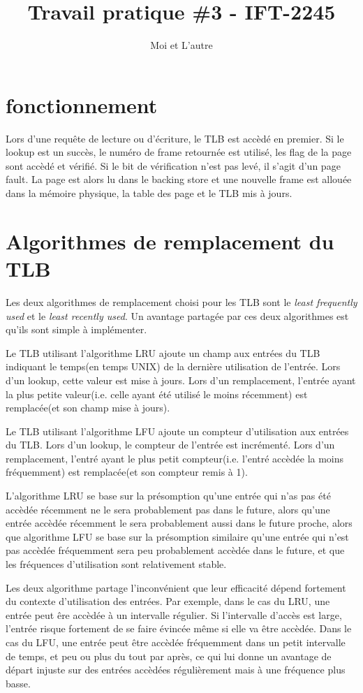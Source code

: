 \documentclass{article}
\title{Travail pratique \#3 - IFT-2245}
\author{Moi et L'autre}
\begin{document}
\maketitle

\section{fonctionnement}
Lors d'une requête de lecture ou d'écriture, le TLB est accèdé en premier. Si le lookup est un succès, le numéro de frame retournée est utilisé, les flag de la page sont accèdé et vérifié. Si le bit de vérification n'est pas levé, il s'agit d'un page fault. La page est alors lu dans le backing store et une nouvelle frame est allouée dans la mémoire physique, la table des page et le TLB mis à jours.


\section{Algorithmes de remplacement du TLB}
Les deux algorithmes de remplacement choisi pour les TLB sont le \emph{least frequently used} et le \emph{least recently used}.
Un avantage partagée par ces deux algorithmes est qu'ils sont simple à implémenter.

Le TLB utilisant l'algorithme LRU ajoute un champ  aux entrées du TLB indiquant le temps(en temps UNIX) de la dernière utilisation de l'entrée. Lors d'un lookup, cette valeur est mise à jours. Lors d'un remplacement, l'entrée ayant la plus petite valeur(i.e. celle ayant été utilisé le moins récemment) est remplacée(et son champ  mise à jours).

Le TLB utilisant l'algorithme LFU ajoute un compteur d'utilisation aux entrées du TLB. Lors d'un lookup, le compteur de l'entrée est incrémenté. Lors d'un remplacement, l'entré ayant le plus petit compteur(i.e. l'entré accèdée la moins fréquemment) est remplacée(et son compteur remis à 1).

L'algorithme LRU se base sur la présomption qu'une entrée qui n'as pas été accèdée récemment ne le sera probablement pas dans le future, alors qu'une entrée accèdée récemment le sera probablement aussi dans le future proche, alors que algorithme LFU se base sur la présomption similaire qu'une entrée qui n'est pas accèdée fréquemment sera peu probablement accèdée dans le future, et que les fréquences d'utilisation sont relativement stable.

Les deux algorithme partage l'inconvénient que leur efficacité dépend fortement du contexte d'utilisation des entrées. Par exemple, dans le cas du LRU, une entrée peut êre accèdée à un intervalle régulier. Si l'intervalle d'accès est large, l'entrée risque fortement de se faire évincée même si elle va être accèdée.
Dans le cas du LFU, une entrée peut être accèdée fréquemment dans un petit intervalle de temps, et peu ou plus du tout par après, ce qui lui donne un avantage de départ injuste sur des entrées accèdées régulièrement mais à une fréquence plus basse.
\end{document}
